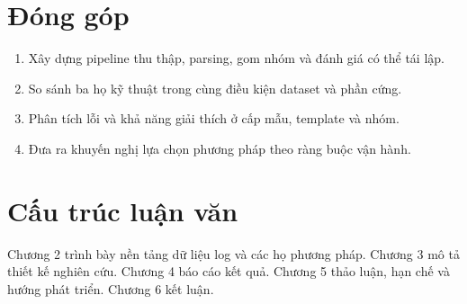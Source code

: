 \section{Đóng góp}
\begin{enumerate}
  \item Xây dựng pipeline thu thập, parsing, gom nhóm và đánh giá có thể tái lập.
  \item So sánh ba họ kỹ thuật trong cùng điều kiện dataset và phần cứng.
  \item Phân tích lỗi và khả năng giải thích ở cấp mẫu, template và nhóm.
  \item Đưa ra khuyến nghị lựa chọn phương pháp theo ràng buộc vận hành.
\end{enumerate}

\section{Cấu trúc luận văn}
Chương 2 trình bày nền tảng dữ liệu log và các họ phương pháp. Chương 3 mô tả
thiết kế nghiên cứu. Chương 4 báo cáo kết quả. Chương 5 thảo luận, hạn chế và
hướng phát triển. Chương 6 kết luận.
